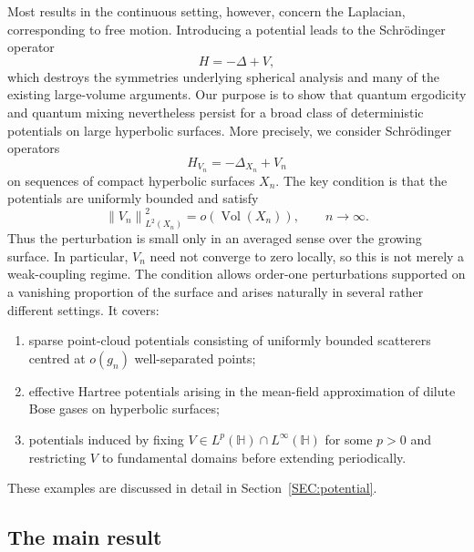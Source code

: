 \documentclass[11pt,twoside,reqno]{amsart}
\newcommand{\R}{\mathbb{R}}
\newcommand{\bH}{\mathbb{H}}
\newcommand{\1}{\mathrm{\mathbf{1}}}
\DeclareMathOperator{\Vol}{Vol}
\newcommand{\norm}[1]{\left\lVert#1\right\rVert}
\numberwithin{equation}{section}
\theoremstyle{plain}
\theoremstyle{definition}
\theoremstyle{remark}
\begin{document}
Most results in the continuous setting, however, concern the Laplacian, corresponding to free motion. Introducing a potential leads to the Schr\"odinger operator
$$
H=-\Delta+V,
$$
which destroys the symmetries underlying spherical analysis and many of the existing large-volume arguments. Our purpose is to show that quantum ergodicity and quantum mixing nevertheless persist for a broad class of deterministic potentials on large hyperbolic surfaces. More precisely, we consider Schr\"odinger operators
$$
H_{V_n}=-\Delta_{X_n}+V_n
$$
on sequences of compact hyperbolic surfaces $X_n$. The key condition is that the potentials are uniformly bounded and satisfy
$$
\norm{V_n}_{L^2(X_n)}^2=o(\Vol(X_n)), \qquad n\to\infty.
$$
Thus the perturbation is small only in an averaged sense over the growing surface. In particular, $V_n$ need not converge to zero locally, so this is not merely a weak-coupling regime. The condition allows order-one perturbations supported on a vanishing proportion of the surface and arises naturally in several rather different settings. It covers:
\begin{enumerate}
    \item sparse point-cloud potentials consisting of uniformly bounded scatterers centred at $o(g_n)$ well-separated points;
    \item effective Hartree potentials arising in the mean-field approximation of dilute Bose gases on hyperbolic surfaces;
    \item potentials induced by fixing $V\in L^p(\bH)\cap L^\infty(\bH)$ for some $p>0$ and restricting $V$ to fundamental domains before extending periodically.
\end{enumerate}
These examples are discussed in detail in Section~\ref{SEC:potential}.

\subsection{The main result}
\end{document}
